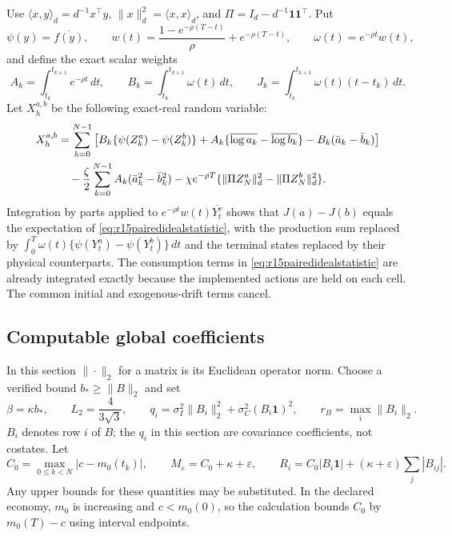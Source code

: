 Use $\langle x,y\rangle_d=d^{-1}x^\top y$,
$\|x\|_d^2=\langle x,x\rangle_d$, and
$\Pi=I_d-d^{-1}\bm1\bm1^\top$. Put
\[
 \psi(y)=\overline{f(y)},\qquad
 w(t)=\frac{1-e^{-\rho(T-t)}}{\rho}+e^{-\rho(T-t)},\qquad
 \omega(t)=e^{-\rho t}w(t),
\]
and define the exact scalar weights
\begin{equation}
 A_k=\int_{t_k}^{t_{k+1}}e^{-\rho t}\,dt,\qquad
 B_k=\int_{t_k}^{t_{k+1}}\omega(t)\,dt,\qquad
 J_k=\int_{t_k}^{t_{k+1}}\omega(t)(t-t_k)\,dt.
 \label{eq:r15pairedweights}
\end{equation}
Let $X_h^{a,b}$ be the following exact-real random variable:
\begin{align}
 X_h^{a,b}
 &=\sum_{k=0}^{N-1}\left[
 B_k\{\psi(Z_k^a)-\psi(Z_k^b)\}
 +A_k\{\overline{\log a_k}-\overline{\log b_k}\}
 -B_k(\bar a_k-\bar b_k)\right]\notag\\
 &\quad-\frac{\zeta}{2}\sum_{k=0}^{N-1}
       A_k(\bar a_k^2-\bar b_k^2)
 -\chi e^{-\rho T}
       \{\|\Pi Z_N^a\|_d^2-\|\Pi Z_N^b\|_d^2\}.
 \label{eq:r15pairedidealstatistic}
\end{align}
Integration by parts applied to
$e^{-\rho t}w(t)\overline{Y_t^v}$ shows that $J(a)-J(b)$ equals
the expectation of \eqref{eq:r15pairedidealstatistic}, with the production
sum replaced by
$\int_0^T\omega(t)\{\psi(Y_t^a)-\psi(Y_t^b)\}\,dt$
and the terminal states replaced by their physical counterparts.
The consumption terms in \eqref{eq:r15pairedidealstatistic} are already
integrated exactly because the implemented actions are held on each cell.
The common initial and exogenous-drift terms cancel.

\subsection{Computable global coefficients}

In this section $\|\cdot\|_2$ for a matrix is its Euclidean operator norm.
Choose a verified bound $b_*\geq\|B\|_2$ and set
\[
 \beta=\kappa b_*,\qquad
 L_2=\frac{4}{3\sqrt3},\qquad
 q_i=\sigma_I^2\|B_i\|_2^2+\sigma_C^2(B_i\bm1)^2,
 \qquad r_B=\max_i\|B_i\|_2.
\]
$B_i$ denotes row $i$ of $B$; the $q_i$ in this section are covariance
coefficients, not costates. Let
\[
 C_0=\max_{0\leq k<N}|c-m_0(t_k)|,\qquad
 M_\varepsilon=C_0+\kappa+\varepsilon,\qquad
 R_i=C_0|B_i\bm1|+(\kappa+\varepsilon)\sum_j|B_{ij}|.
\]
Any upper bounds for these quantities may be substituted. In the declared
economy, $m_0$ is increasing and $c<m_0(0)$, so the calculation bounds
$C_0$ by $m_0(T)-c$ using interval endpoints.

